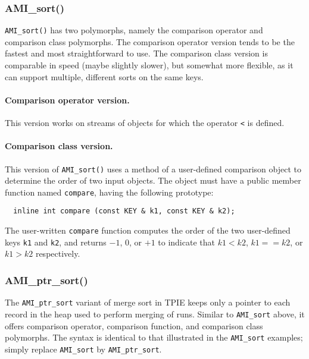 \subsubsection{AMI\_sort()}
\lstinline|AMI_sort()| has two polymorphs, namely the comparison
operator and comparison class polymorphs. The comparison operator
version tends to be the fastest and most straightforward to use. The
comparison class version is comparable in speed (maybe slightly
slower), but somewhat more flexible, as it can support multiple,
different sorts on the same keys.

\paragraph{Comparison operator version.} This version works on streams of
objects for which the operator \lstinline|<| is defined.

\paragraph{Comparison class version.} 
This version of \lstinline|AMI_sort()| uses a method of a user-defined
comparison object to determine the order of two input objects. The
object must have a public member function named \lstinline|compare|,
having the following prototype:
\begin{lstlisting}
  inline int compare (const KEY & k1, const KEY & k2);
\end{lstlisting}

The user-written \lstinline|compare| function computes the order of
the two user-defined keys \lstinline|k1| and \lstinline|k2|, and
returns $-1$, $0$, or $+1$ to indicate that $k1<k2$, $k1==k2$, or
$k1>k2$ respectively.


\subsubsection{AMI\_ptr\_sort()}

The \lstinline|AMI_ptr_sort| variant of merge sort in TPIE keeps only
a pointer to each record in the heap used to perform merging of runs.
Similar to \lstinline|AMI_sort| above, it offers comparison operator,
comparison function, and comparison class polymorphs. The syntax is
identical to that illustrated in the \lstinline|AMI_sort| examples;
simply replace \lstinline|AMI_sort| by \lstinline|AMI_ptr_sort|.


